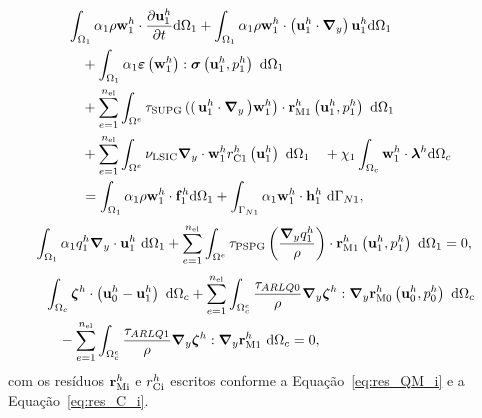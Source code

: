 \begin{align}
	\begin{split}
		&\int_{\localModel} \arlequinWFLocal \density \wlocalh \cdot \frac{\partial\ulocalh}{\partial t} \deriv \localModel +
		\int_{\localModel} \arlequinWFLocal \density \wlocalh \cdot  \left(\ulocalh \cdot \gradient \right)\ulocalh \deriv \localModel  \\ 
		&\quad+	
		\int_{\localModel} \arlequinWFLocal \straintensor \left(\wlocalh\right) : \stressTensor \left(\ulocalh,\plocalh\right)\ \deriv \localModel 
		\\ 
		&\quad+ \sum_{e=1}^{\nel} \int_{\domainE} \SUPG  \left( \right(\ulocalh \cdot \gradient \left) \wlocalh\right) \cdot \resMomLocal\left(\ulocalh,\plocalh \right)\  \deriv \localModel \\ 
		&\quad+\sum_{e=1}^{\nel} \int_{\domainE} \LSIC \divergence \cdot \wlocalh \resPreLocal
		\left(\ulocalh\right)\  \deriv \localModel 
		\quad+ \chi_{1} \int_{\gluingZone} \wlocalh \cdot \lagrangeMultiplierh \deriv \gluingZone  \\
		&\quad= \int_{\localModel} \arlequinWFLocal \density \wlocalh \cdot  \localsbodyforceh \deriv \localModel + \int_{\localBoundaryN} \arlequinWFLocal \wlocalh \cdot \localSurfaceLoadh\ \deriv \localBoundaryN,
		\label{eq:QM_forma_fraca_1_atu}
	\end{split}
\end{align}
\begin{align}
	\begin{split}
		&	\int_{\Omega_1} \alpha_1 q_1^h \boldsymbol{\nabla}_y \cdot \mathbf{u}_1^h \ \mathrm{d} \Omega_1 +
		\sum_{e=1}^{n_{\mathrm{el}}} \int_{\Omega^e} \tau_{\mathrm{PSPG}} \left(\frac{\boldsymbol{\nabla}_y q_1^h}{\rho}\right) \cdot \mathbf{r}_{\mathrm{M1}}^{h} \left(\mathbf{u}_1^h,p_1^h\right) \  \mathrm{d} \Omega_1 = 0,
		\label{eq:C_forma_fraca_1_atu}
	\end{split}
\end{align}
\begin{align}
	\begin{split}
		&\int_{\Omega_c}  \boldsymbol{\zeta}^h  \cdot \left(\mathbf{u}_0^h - \mathbf{u}_1^h \right) \ \mathrm{d} \Omega_c + \sum_{e=1}^{n_{\mathrm{el}}} \int_{\Omega^e_{c}} \frac{\tau_{ARLQ0}}{\rho} \boldsymbol{\nabla}_y \boldsymbol{\zeta}^h : \boldsymbol{\nabla}_y \mathbf{r}_{\mathrm{M0}}^{h}\left(\mathbf{u}_0^h,p_0^h\right) \ \mathrm{d} \Omega_c  \\
		&\quad-\sum_{e=1}^{n_{\mathrm{el}}} \int_{\Omega^e_{c}} \frac{\tau_{ARLQ1}}{\rho} \boldsymbol{\nabla}_y \boldsymbol{\zeta}^h : \boldsymbol{\nabla}_y \mathbf{r}_{\mathrm{M1}}^{h} \ \mathrm{d} \Omega_c = 0,
		\label{eq:lag_acopl_tARLQ}
	\end{split}
\end{align}
\noindent com os resíduos $\mathbf{r}_{\mathrm{Mi}}^{h}$ e $r_{\mathrm{Ci}}^{h}$ escritos conforme a Equação~\eqref{eq:res_QM_i} e a Equação~\eqref{eq:res_C_i}.


